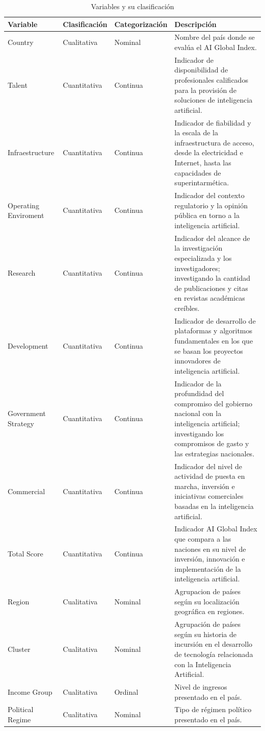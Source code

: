 \documentclass[
]{article}
\begin{document}
\renewcommand{\arraystretch}{1.5}
\begin{footnotesize}
\begin{longtable}[t]{lllp{8cm}}
\caption{\label{tab:tabla1}Variables y su clasificación}\\
\toprule
Variable & Clasificación & Categorización & Descripción\\
\midrule
Country & Cualitativa & Nominal & Nombre del país donde se evalúa el AI Global Index.\\
Talent & Cuantitativa & Continua & Indicador de disponibilidad de profesionales calificados para la provisión de soluciones de inteligencia artificial.\\
Infraestructure & Cuantitativa & Continua & Indicador de fiabilidad y la escala de la infraestructura de acceso, desde la electricidad e Internet, hasta las capacidades de superintarmética.\\
Operating Enviroment & Cuantitativa & Continua & Indicador del contexto regulatorio y la opinión pública en torno a la inteligencia artificial.\\
Research & Cuantitativa & Continua & Indicador del alcance de la investigación especializada y los investigadores; investigando la cantidad de publicaciones y citas en revistas académicas creíbles.\\
\addlinespace
Development & Cuantitativa & Continua & Indicador de desarrollo de plataformas y algoritmos fundamentales en los que se basan los proyectos innovadores de inteligencia artificial.\\
Government Strategy & Cuantitativa & Continua & Indicador de la profundidad del compromiso del gobierno nacional con la inteligencia artificial; investigando los compromisos de gasto y las estrategias nacionales.\\
Commercial & Cuantitativa & Continua & Indicador del nivel de actividad de puesta en marcha, inversión e iniciativas comerciales basadas en la inteligencia artificial.\\
Total Score & Cuantitativa & Continua & Indicador AI Global Index que compara a las naciones en su nivel de inversión, innovación e implementación de la inteligencia artificial.\\
Region & Cualitativa & Nominal & Agrupacion de países según su localización geográfica en regiones.\\
\addlinespace
Cluster & Cualitativa & Nominal & Agrupación de países según su historia de incursión en el desarrollo de tecnología relacionada con la Inteligencia Artificial.\\
Income Group & Cualitativa & Ordinal & Nivel de ingresos presentado en el país.\\
Political Regime & Cualitativa & Nominal & Tipo de régimen político presentado en el país.\\
\bottomrule
\end{longtable}

\end{footnotesize}\renewcommand{\arraystretch}{1}
\end{document}
